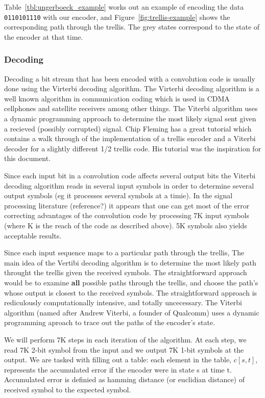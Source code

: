 \documentclass{article}
\begin{document}
Table~\ref{tbl:ungerboeck_example} works out an example of encoding 
the data \texttt{0110101110} with our encoder,
and Figure~\ref{fig:trellis-example} shows the corresponding path through
the trellis. The grey states correspond to the state of the encoder 
at that time. 

\subsubsection{Decoding}

Decoding a bit stream that has been encoded with a convolution code is usually
done using the Virterbi decoding algorithm. The Virterbi decoding algorithm
is a well known algorithm in communication coding which is used in CDMA cellphones
and satellite receivers among other things. The Viterbi algorithm uses a dynamic programming
approach to determine the most likely signal sent given a recieved (possibly corrupted) signal. 
Chip Fleming has a great tutorial\cite{fleming:tutorial} which contains a walk 
through of the implementation of a trellis encoder and a Viterbi decoder 
for a slightly different 1/2 trellis code. His tutorial was the inspiration for this document.

Since each input bit in a convolution code affects several output bits
the Viterbi decoding algorithm reads in several input symbols in order to determine
several output symbols (eg it processes several symbols at a timie). In the
signal processing literature (reference?) it appears that one can get most
of the error correcting advantages of the convolution code by processing 7K input symbols
(where K is the reach of the code as described above). 5K symbols also yields
acceptable results.

Since each input sequence maps to a particular path through the trellis,
The main idea of the Vertibi decoding algorithm is to determine the most
likely path throught the trellis given the received symbols. The straightforward
approach would be to examine \textbf{all} possible paths through the trellis, and
choose the path's whose output is closest to the received symbols. The
straightforward approach is rediculously computationally intensive, 
and totally uncecessary. The Viterbi algorithm (named after Andrew Viterbi, a founder of Qualcomm)
uses a dynamic programming aproach to trace out the paths of the encoder's state. 

We will perform 7K steps in each iteration of the algorithm. 
At each step, we read 7K 2-bit symbol
from the input and we output 7K 1-bit symbols at the output. 
We are tasked with filling out a table: each element in the table, $c[s,t]$, 
represents the accumulated error if the encoder were in state s at time t. 
Accumulated error is definied as hamming distance
(or euclidian distance) of received symbol to the expected symbol.
\end{document}
